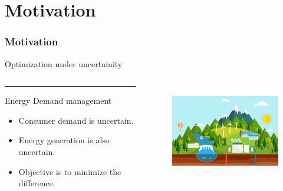 

\section{Motivation}
\begin{frame}
\frametitle{\centering Motivation}
\begin{small}
\begin{block}{Optimization under uncertainity}
\begin{columns}[T]
\begin{column}{.48\textwidth}
\color{red}\rule{\linewidth}{4pt}
Energy Demand management
\begin{itemize}
\item Consumer demand is uncertain.
\item Energy generation is also uncertain.
\item Objective is to minimize the difference.
\end{itemize}
\end{column}
\begin{column}{.48\textwidth}
\begin{figure}
\includegraphics[width=6cm,height=4cm]{energymgmt}
\end{figure}
\end{column}
\end{columns}
\end{block}
\end{small}
\end{frame}




